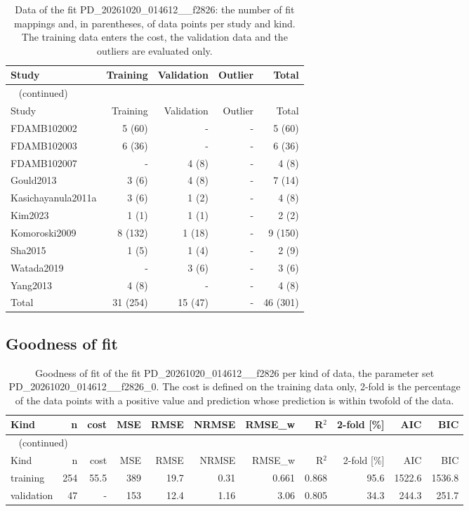 \begin{longtable}{lrrrr}
\caption{Data of the fit PD\_20261020\_014612\_\_f2826: the number of fit mappings and, in parentheses, of data points per study and kind. The training data enters the cost, the validation data and the outliers are evaluated only.}\label{tab:data:PD_20261020_014612__f2826} \\
\toprule
Study & Training & Validation & Outlier & Total \\
\midrule
\endfirsthead
\multicolumn{5}{l}{\small\tablename~\thetable{} (continued)} \\
\toprule
Study & Training & Validation & Outlier & Total \\
\midrule
\endhead
\bottomrule
\endlastfoot
FDAMB102002 & 5 (60) & - & - & 5 (60) \\
FDAMB102003 & 6 (36) & - & - & 6 (36) \\
FDAMB102007 & - & 4 (8) & - & 4 (8) \\
Gould2013 & 3 (6) & 4 (8) & - & 7 (14) \\
Kasichayanula2011a & 3 (6) & 1 (2) & - & 4 (8) \\
Kim2023 & 1 (1) & 1 (1) & - & 2 (2) \\
Komoroski2009 & 8 (132) & 1 (18) & - & 9 (150) \\
Sha2015 & 1 (5) & 1 (4) & - & 2 (9) \\
Watada2019 & - & 3 (6) & - & 3 (6) \\
Yang2013 & 4 (8) & - & - & 4 (8) \\
Total & 31 (254) & 15 (47) & - & 46 (301) \\
\end{longtable}

\subsection{Goodness of fit}

\begin{longtable}{lrrrrrrrrrr}
\caption{Goodness of fit of the fit PD\_20261020\_014612\_\_f2826 per kind of data, the parameter set PD\_20261020\_014612\_\_f2826\_0. The cost is defined on the training data only, 2-fold is the percentage of the data points with a positive value and prediction whose prediction is within twofold of the data.}\label{tab:metrics:PD_20261020_014612__f2826} \\
\toprule
Kind & n & cost & MSE & RMSE & NRMSE & RMSE\_w & R\ensuremath{^{2}} & 2-fold [\%] & AIC & BIC \\
\midrule
\endfirsthead
\multicolumn{11}{l}{\small\tablename~\thetable{} (continued)} \\
\toprule
Kind & n & cost & MSE & RMSE & NRMSE & RMSE\_w & R\ensuremath{^{2}} & 2-fold [\%] & AIC & BIC \\
\midrule
\endhead
\bottomrule
\endlastfoot
training & 254 & 55.5 & 389 & 19.7 & 0.31 & 0.661 & 0.868 & 95.6 & 1522.6 & 1536.8 \\
validation & 47 & - & 153 & 12.4 & 1.16 & 3.06 & 0.805 & 34.3 & 244.3 & 251.7 \\
\end{longtable}

